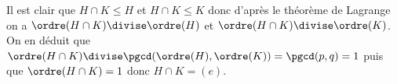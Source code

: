 Il est clair que $H\cap K\leqslant H$ et $H\cap K\leqslant K$ donc d'après le
théorème de Lagrange on a $\ordre(H\cap K)\divise\ordre(H)$ et
$\ordre(H\cap K)\divise\ordre(K)$. On en déduit que
$\ordre(H\cap K)\divise \pgcd(\ordre(H),\ordre(K)) = \pgcd(p,q)=1$
puis que $\ordre(H\cap K) = 1$ donc $H\cap K=(e)$.
